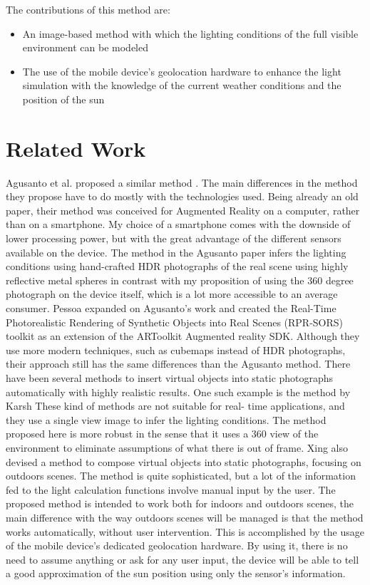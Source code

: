 \documentclass{article}
\begin{document}
The contributions of this method are:
\begin{itemize}
    \item An image-based method with which the lighting conditions of the full visible environment can be modeled
    \item The use of the mobile device's geolocation hardware to enhance the light simulation with the knowledge of the current weather conditions and the position of the sun
\end{itemize}


\section{Related Work}
Agusanto et al. proposed a similar method \cite{agusanto2003}. The main differences in the method they propose have to do mostly with the technologies used. Being already an old paper, their method was conceived for Augmented Reality on a computer, rather than on a smartphone. My choice of a smartphone comes with the downside of lower processing power, but with the great advantage of the different sensors available on the device. The method in the Agusanto paper infers the lighting conditions using hand-crafted HDR photographs of the real scene using highly reflective metal spheres in contrast with my proposition of using the 360 degree photograph on the device itself, which is a lot more accessible to an average consumer.\newline
Pessoa\cite{pessoa2011} expanded on Agusanto's work and created the Real-Time Photorealistic Rendering of Synthetic Objects into Real Scenes (RPR-SORS) toolkit as an extension of the ARToolkit Augmented reality SDK. Although they use more modern techniques, such as cubemaps instead of HDR photographs, their approach still has the same differences than the Agusanto method.\newline
There have been several methods to insert virtual objects into static photographs automatically with highly realistic results. One such example is the method by Karsh \cite{karsh2014} These kind of methods are not suitable for real- time applications, and they use a single view image to infer the lighting conditions. The method proposed here is more robust in the sense that it uses a 360 view of the environment to eliminate assumptions of what there is out of frame.\newline
Xing\cite{xing2013} also devised a method to compose virtual objects into static photographs, focusing on outdoors scenes. The method is quite sophisticated, but a lot of the information fed to the light calculation functions involve manual input by the user. The proposed method is intended to work both for indoors and outdoors scenes, the main difference with the way outdoors scenes will be managed is that the method works automatically, without user intervention. This is accomplished by the usage of the mobile device's dedicated geolocation hardware. By using it, there is no need to assume anything or ask for any user input, the device will be able to tell a good approximation of the sun position using only the sensor's information.
\end{document}
